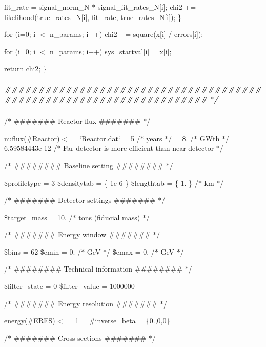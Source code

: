 fit\+\_\+rate = signal\+\_\+norm\+\_\+N $\ast$ signal\+\_\+fit\+\_\+rates\+\_\+N\mbox{[}i\mbox{]}; chi2 += likelihood(true\+\_\+rates\+\_\+\+N\mbox{[}i\mbox{]}, fit\+\_\+rate, true\+\_\+rates\+\_\+\+N\mbox{[}i\mbox{]}); \}

for (i=0; i $<$ n\+\_\+params; i++) chi2 += square(x\mbox{[}i\mbox{]} / errors\mbox{[}i\mbox{]});

for (i=0; i $<$ n\+\_\+params; i++) sys\+\_\+startval\mbox{[}i\mbox{]} = x\mbox{[}i\mbox{]};

return chi2; \}

\subparagraph*{\#\#\#\#\#\#\#\#\#\#\#\#\#\#\#\#\#\#\#\#\#\#\#\#\#\#\#\#\#\#\#\#\#\#\#\#\#\#\#\#\#\#\#\#\#\#\#\#\#\#\#\#\#\#\#\#\#\#\#\#\#\#\#\#\#\#\#\# $\ast$/}

/$\ast$ \#\#\#\#\#\#\# Reactor flux \#\#\#\#\#\#\# $\ast$/

nuflux(\#\+Reactor)$<$  = \char`\"{}\+Reactor.\+dat\char`\"{}  = 5 /$\ast$ years $\ast$/  = 8. /$\ast$ G\+Wth $\ast$/  = 6.\+59584443e-\/12 /$\ast$ Far detector is more efficient than near detector $\ast$/ \begin{quote}


\end{quote}


/$\ast$ \#\#\#\#\#\#\#\# Baseline setting \#\#\#\#\#\#\#\# $\ast$/

\$profiletype = 3 \$densitytab = \{ 1e-\/6 \} \$lengthtab = \{ 1. \} /$\ast$ km $\ast$/

/$\ast$ \#\#\#\#\#\#\# Detector settings \#\#\#\#\#\#\# $\ast$/

\$target\+\_\+mass = 10. /$\ast$ tons (fiducial mass) $\ast$/

/$\ast$ \#\#\#\#\#\#\# Energy window \#\#\#\#\#\#\# $\ast$/

\$bins = 62 \$emin = 0. /$\ast$ GeV $\ast$/ \$emax = 0. /$\ast$ GeV $\ast$/

/$\ast$ \#\#\#\#\#\#\#\# Technical information \#\#\#\#\#\#\#\# $\ast$/

\$filter\+\_\+state = 0 \$filter\+\_\+value = 1000000

/$\ast$ \#\#\#\#\#\#\# Energy resolution \#\#\#\#\#\#\# $\ast$/

energy(\#\+E\+R\+ES)$<$  = 1  = \#inverse\+\_\+beta  = \{0.,0,0\} \begin{quote}


\end{quote}


/$\ast$ \#\#\#\#\#\#\# Cross sections \#\#\#\#\#\#\# $\ast$/


